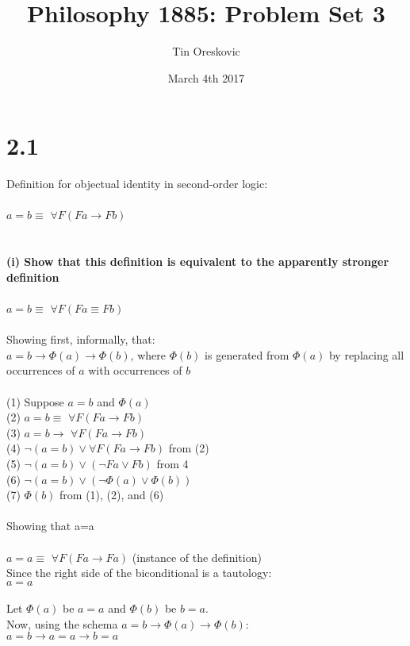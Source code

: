 \documentclass{article}
\title{Philosophy 1885: Problem Set 3}
\author{Tin Oreskovic}
\date{March 4th 2017}
\begin{document}
\maketitle
\section*{2.1}
Definition for objectual identity in second-order logic:\\\\
$a = b \equiv$ $\forall F (Fa \rightarrow Fb)$\\\\
\\\textbf{(i)  Show that this definition is equivalent to the apparently stronger definition}\\\\
$a = b \equiv$ $\forall F (Fa \equiv Fb)$\\\\
Showing first, informally, that:\\
$a=b \rightarrow \Phi(a) \rightarrow \Phi(b)$, where  $\Phi(b)$ is generated from $\Phi(a)$ by replacing all occurrences of $a$ with occurrences of $b$\\\\
(1) Suppose $a=b$ and $\Phi(a)$\\
(2) $a = b \equiv$ $\forall F (Fa \rightarrow Fb)$\\
(3) $a = b \rightarrow$ $\forall F (Fa \rightarrow Fb)$\\
(4) $\neg(a=b) \vee \forall F (Fa \rightarrow Fb)$  from (2)\\
(5) $\neg(a=b) \vee (\neg Fa \vee Fb)$ from 4\\
(6) $\neg(a=b) \vee (\neg \Phi(a) \vee \Phi(b))$\\
(7) $\Phi(b)$ from (1), (2), and (6)
\\\\
Showing that a=a\\\\
$a = a \equiv$ $\forall F (Fa \rightarrow Fa)$ (instance of the definition)\\
Since the right side of the biconditional is a tautology:\\
$a = a$ \\\\
Let $\Phi(a)$ be $a=a$ and $\Phi(b)$ be $b=a$.\\
Now, using the schema $a=b \rightarrow \Phi(a) \rightarrow \Phi(b)$: \\
$a=b \rightarrow a=a \rightarrow b=a$\\
\end{document}
